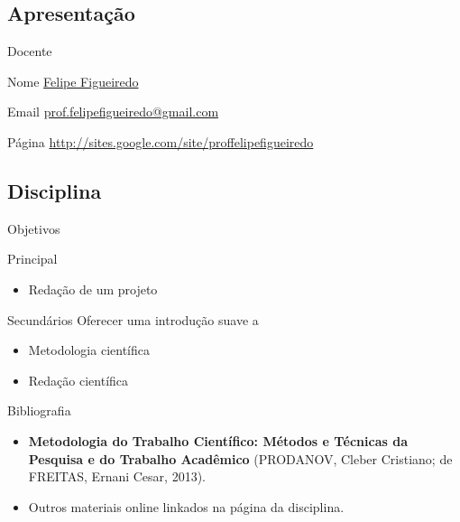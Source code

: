 \documentclass{beamer}
\begin{document}
\subsection{Apresentação}

\begin{frame}{Docente}
\begin{block}{Nome}
    \href{https://www.linkedin.com/pub/felipe-figueiredo/13/896/979}{Felipe Figueiredo}
  \end{block}

\bigskip

\begin{block}{Email}
  \href{mailto:prof.felipefigueiredo@gmail.com}{prof.felipefigueiredo@gmail.com}
\end{block}

\bigskip

\begin{block}{Página}
  \href{http://sites.google.com/site/proffelipefigueiredo}{http://sites.google.com/site/proffelipefigueiredo}
\end{block}

\end{frame}

\subsection{Disciplina}

\begin{frame}{Objetivos}

  \begin{block}{Principal}
    \begin{itemize}
    \item Redação de um projeto
    \end{itemize}
  \end{block}

  \begin{block}{Secundários}
    Oferecer uma introdução suave a
    \begin{itemize}
    \item Metodologia científica
    \item Redação científica
    \end{itemize}
  \end{block}

\end{frame}

\begin{frame}{Bibliografia}
  \begin{itemize}
  \item {\bf Metodologia do Trabalho Científico: Métodos e Técnicas da Pesquisa e do Trabalho Acadêmico} (PRODANOV, Cleber Cristiano; de FREITAS, Ernani Cesar, 2013).
  \item Outros materiais online linkados na página da disciplina.
  \end{itemize}
\end{frame}
\end{document}
